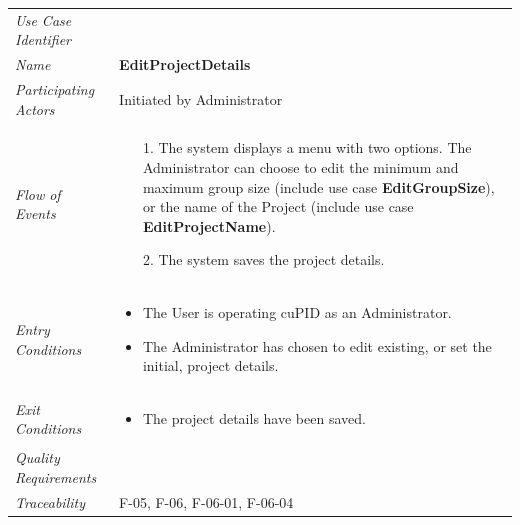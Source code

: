 \documentclass[12pt,letterpaper]{article}
\begin{document}
\begin{center}
	\begin{tabu} to 
		\toprule
		Use Case Identifier & \editprojectdetails{} \\
		Name & {\bf EditProjectDetails} \\
		Participating Actors & Initiated by Administrator \\
		Flow of Events & 
		\begin{minipage}[t]{\linewidth}
		    \begin{enumerate}
			    \item[1.] The system displays a menu with two options. The Administrator can choose to edit the minimum and maximum group size (include use case \textbf{EditGroupSize}), or the name of the Project (include use case \textbf{EditProjectName}).
			    \item[2.] The system saves the project details.
			\end{enumerate}
		\end{minipage} \\

		Entry Conditions &
		\begin{minipage}[t]{\linewidth}
			\begin{itemize}
			    \item The User is operating cuPID as an Administrator.
			    \item The Administrator has chosen to edit existing, or set the initial, project details.
	        \end{itemize}
		\end{minipage} \\

		Exit Conditions &
		\begin{minipage}[t]{\linewidth}
			\begin{itemize}
			    \item The project details have been saved.
	        \end{itemize}
		\end{minipage} \\


		Quality Requirements & \\

		Traceability & F-05, F-06, F-06-01, F-06-04 \\
		\toprule
	\end{tabu}
\end{center}
\end{document}
